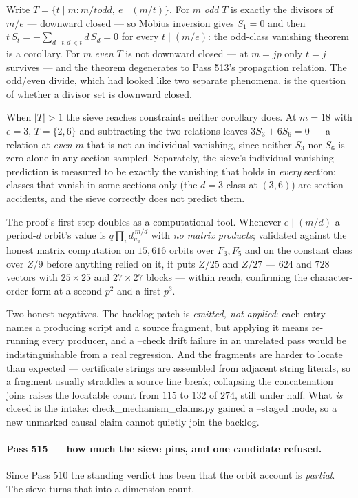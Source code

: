 \documentclass[12pt,a4paper]{article}
\def\mathbb#1{#1}%
\def\textbf#1{#1}%
\def\texttt#1{#1}%
\def\text#1{#1}%
\theoremstyle{definition}
\newcommand{\FF}{\mathbb{F}}
\newcommand{\ZZ}{\mathbb{Z}}
\begin{document}
Write $T=\{t\mid m: m/t \text{ odd},\ e\mid(m/t)\}$.  For $m$ \emph{odd} $T$ is
exactly the divisors of $m/e$ --- downward closed --- so M\"obius inversion
gives $S_1=0$ and then $t\,S_t=-\sum_{d\mid t,d<t}d\,S_d=0$ for every
$t\mid(m/e)$: \textbf{the odd-class vanishing theorem is a corollary}.  For $m$
\emph{even} $T$ is not downward closed --- at $m=jp$ only $t=j$ survives --- and
the theorem degenerates to Pass 513's propagation relation.  The odd/even
divide, which had looked like two separate phenomena, is the question of
whether a divisor set is downward closed.

When $\lvert T\rvert>1$ the sieve reaches constraints neither corollary does.
At $m=18$ with $e=3$, $T=\{2,6\}$ and subtracting the two relations leaves
$3S_3+6S_6=0$ --- a relation at \emph{even} $m$ that is not an individual
vanishing, since neither $S_3$ nor $S_6$ is zero alone in any section sampled.
Separately, the sieve's individual-vanishing prediction is measured to be
exactly the vanishing that holds in \emph{every} section: classes that vanish
in some sections only (the $d=3$ class at $(3,6)$) are section accidents, and
the sieve correctly does not predict them.

The proof's first step doubles as a computational tool.  Whenever $e\mid(m/d)$
a period-$d$ orbit's value is $q\prod_i d_{w_i}^{\,m/d}$ with \emph{no matrix
products}; validated against the honest matrix computation on $15{,}616$ orbits
over $\FF_3,\FF_5$ and on the constant class over $\ZZ/9$ before anything
relied on it, it puts $\ZZ/25$ and $\ZZ/27$ --- $624$ and $728$ vectors with
$25\times25$ and $27\times27$ blocks --- within reach, confirming the
character-order form at a second $p^2$ and a first $p^3$.

Two honest negatives.  The backlog patch is \emph{emitted, not applied}: each
entry names a producing script and a source fragment, but applying it means
re-running every producer, and a \texttt{--check} drift failure in an unrelated
pass would be indistinguishable from a real regression.  And the fragments are
harder to locate than expected --- certificate strings are assembled from
adjacent string literals, so a fragment usually straddles a source line break;
collapsing the concatenation joins raises the locatable count from $115$ to
$132$ of $274$, still under half.  What \emph{is} closed is the intake:
\texttt{check\_mechanism\_claims.py} gained a \texttt{--staged} mode, so a new
unmarked causal claim cannot quietly join the backlog.

\paragraph{Pass 515 --- how much the sieve pins, and one candidate refused.}
Since Pass 510 the standing verdict has been that the orbit account is
\emph{partial}.  The sieve turns that into a dimension count.
\end{document}
